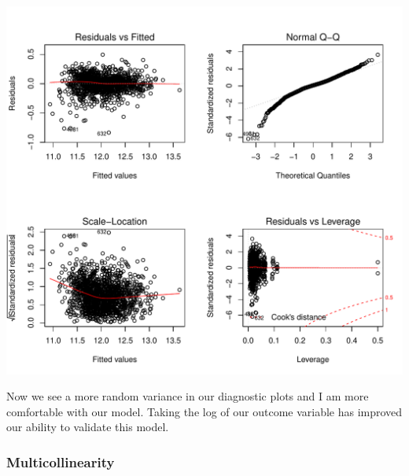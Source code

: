 \documentclass[]{article}
\newenvironment{Shaded}{\begin{snugshade}}{\end{snugshade}}
\newcommand{\KeywordTok}[1]{\textcolor[rgb]{0.13,0.29,0.53}{\textbf{{#1}}}}
\newcommand{\DataTypeTok}[1]{\textcolor[rgb]{0.13,0.29,0.53}{{#1}}}
\newcommand{\DecValTok}[1]{\textcolor[rgb]{0.00,0.00,0.81}{{#1}}}
\newcommand{\StringTok}[1]{\textcolor[rgb]{0.31,0.60,0.02}{{#1}}}
\newcommand{\OtherTok}[1]{\textcolor[rgb]{0.56,0.35,0.01}{{#1}}}
\newcommand{\NormalTok}[1]{{#1}}
\begin{document}
\includegraphics{Final_Project_files/figure-latex/unnamed-chunk-25-1.pdf}

Now we see a more random variance in our diagnostic plots and I am more
comfortable with our model. Taking the log of our outcome variable has
improved our ability to validate this model.

\newpage

\subsubsection{Multicollinearity}\label{multicollinearity}

\begin{Shaded}
\end{Shaded}
\end{document}
